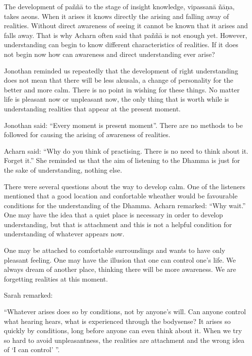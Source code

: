 The development of paññā to the stage of insight knowledge, vipassanā
ñāṇa, takes aeons. When it arises it knows directly the arising and
falling away of realities. Without direct awareness of seeing it cannot
be known that it arises and falls away. That is why Acharn often said
that paññā is not enough yet. However, understanding can begin to know
different characteristics of realities. If it does not begin now how can
awareness and direct understanding ever arise?

Jonothan reminded us repeatedly that the development of right
understanding does not mean that there will be less akusala, a change of
personality for the better and more calm. There is no point in wishing
for these things. No matter life is pleasant now or unpleasant now, the
only thing that is worth while is understanding realities that appear at
the present moment.

Jonothan said: ``Every moment is present moment''. There are no methods
to be followed for causing the arising of awareness of realities.

Acharn said: ``Why do you think of practising. There is no need to think
about it. Forget it.'' She reminded us that the aim of listening to the
Dhamma is just for the sake of understanding, nothing else.

There were several questions about the way to develop calm. One of the
listeners mentioned that a good location and confortable wheather would
be favourable conditions for the understanding of the Dhamma. Acharn
remarked: ``Why wait.'' One may have the idea that a quiet place is
necessary in order to develop understanding, but that is attachment and
this is not a helpful condition for understanding of whatever appears
now.

One may be attached to comfortable surroundings and wants to have only
pleasant feeling. One may have the illusion that one can control one's
life. We always dream of another place, thinking there will be more
awareness. We are forgetting realities at this moment.

Sarah remarked:

``Whatever arises does so by conditions, not by anyone's will. Can
anyone control what hearing hears, what is experienced through the
bodysense? It arises so quickly by conditions, long before anyone can
even think about it. When we try so hard to avoid unpleasantness, the
realities are attachment and the wrong idea of `I can
control' ''.

